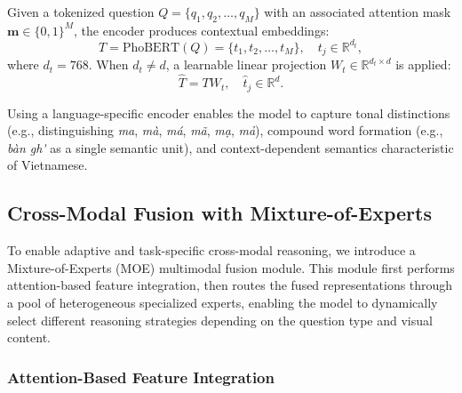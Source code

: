 Given a tokenized question $Q = \{q_1, q_2, \ldots, q_M\}$ with an associated attention mask $\mathbf{m} \in \{0,1\}^M$, the encoder produces contextual embeddings:
\begin{equation}
    T = \text{PhoBERT}(Q) = \{t_1, t_2, \ldots, t_M\}, \quad t_j \in \mathbb{R}^{d_t},
    \label{eq:text_enc}
\end{equation}
where $d_t = 768$. When $d_t \neq d$, a learnable linear projection $W_t \in \mathbb{R}^{d_t \times d}$ is applied:
\begin{equation}
    \hat{T} = T W_t, \quad \hat{t}_j \in \mathbb{R}^{d}.
\end{equation}

Using a language-specific encoder enables the model to capture tonal distinctions (e.g., distinguishing \textit{ma}, \textit{m\`a}, \textit{m\'a}, \textit{m\~a}, \textit{m\d{a}}, \textit{m\h{a}}), compound word formation (e.g., \textit{b\`an gh\'\ecircumflex} as a single semantic unit), and context-dependent semantics characteristic of Vietnamese.

\subsection{Cross-Modal Fusion with Mixture-of-Experts}
\label{sec:method:fusion}

To enable adaptive and task-specific cross-modal reasoning, we introduce a Mixture-of-Experts (MOE) multimodal fusion module. This module first performs attention-based feature integration, then routes the fused representations through a pool of heterogeneous specialized experts, enabling the model to dynamically select different reasoning strategies depending on the question type and visual content.

\subsubsection{Attention-Based Feature Integration}
\label{sec:method:fusion:attention}

